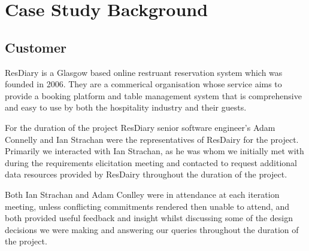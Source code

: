 \documentclass{l3proj}
\begin{document}
\section{Case Study Background}
\label{sec:background}

\subsection{Customer}
\label{customer}


ResDiary is a Glasgow based online restruant reservation system which was founded in 2006. They are a commerical organisation whose service aims to provide a booking platform and table management system that is comprehensive and easy to use by both the hospitality industry and their guests.

For the duration of the project ResDiary senior software engineer's Adam Connelly and Ian Strachan were the representatives of ResDairy for the project.
Primarily we interacted with Ian Strachan, as he was whom we initially met with during the requirements elicitation meeting and contacted to request additional data resources provided by ResDairy throughout the duration of the project.

Both Ian Strachan and Adam Conlley were in attendance at each iteration meeting, unless conflicting commitments rendered then unable to attend, and both provided useful feedback and insight whilst discussing some of the design decisions we were making and answering our queries throughout the duration of the project.
\end{document}
